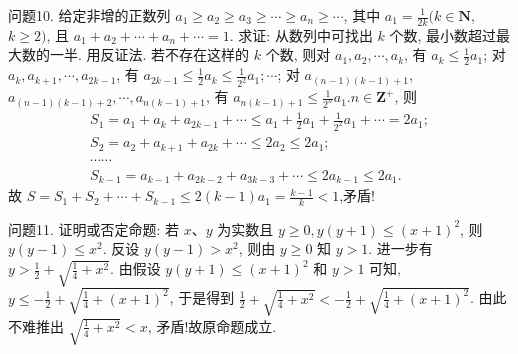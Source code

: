 问题10. 给定非增的正数列 $a_1 \geqslant a_2 \geqslant a_3 \geqslant \cdots \geqslant a_n \geqslant \cdots$, 其中 $a_1=\frac{1}{2 k}(k \in \mathbf{N}$, $k \geqslant 2)$, 且 $a_1+a_2+\cdots+a_n+\cdots=1$. 求证: 从数列中可找出 $k$ 个数, 最小数超过最大数的一半.
用反证法.
若不存在这样的 $k$ 个数, 则对 $a_1, a_2, \cdots, a_k$, 有 $a_k \leqslant \frac{1}{2} a_1$; 对 $a_k, a_{k+1}, \cdots, a_{2 k-1}$, 有 $a_{2 k-1} \leqslant \frac{1}{2} a_k \leqslant \frac{1}{2^2} a_1 ; \cdots$; 对 $a_{(n-1)(k-1)+1}$, $a_{(n-1)(k-1)+2}, \cdots, a_{n(k-1)+1}$, 有 $a_{n(k-1)+1} \leqslant \frac{1}{2^n} a_1 . n \in \mathbf{Z}^{+}$, 则
$$
\begin{gathered}
S_1=a_1+a_k+a_{2 k-1}+\cdots \leqslant a_1+\frac{1}{2} a_1+\frac{1}{2^2} a_1+\cdots=2 a_1 ; \\
S_2=a_2+a_{k+1}+a_{2 k}+\cdots \leqslant 2 a_2 \leqslant 2 a_1 ; \\
\cdots \cdots \\
S_{k-1}=a_{k-1}+a_{2 k-2}+a_{3 k-3}+\cdots \leqslant 2 a_{k-1} \leqslant 2 a_1 .
\end{gathered}
$$
故 $S=S_1+S_2+\cdots+S_{k-1} \leqslant 2(k-1) a_1=\frac{k-1}{k}<1$,矛盾!



问题11. 证明或否定命题: 若 $x 、 y$ 为实数且 $y \geqslant 0, y(y+1) \leqslant(x+1)^2$, 则 $y(y-1) \leqslant x^2$.
反设 $y(y-1)>x^2$, 则由 $y \geqslant 0$ 知 $y>1$. 进一步有 $y>\frac{1}{2}+ \sqrt{\frac{1}{4}+x^2}$. 由假设 $y(y+1) \leqslant(x+1)^2$ 和 $y>1$ 可知, $y \leqslant-\frac{1}{2}+ \sqrt{\frac{1}{4}+(x+1)^2}$, 于是得到 $\frac{1}{2}+\sqrt{\frac{1}{4}+x^2}<-\frac{1}{2}+\sqrt{\frac{1}{4}+(x+1)^2}$.
由此不难推出 $\sqrt{\frac{1}{4}+x^2}<x$, 矛盾!故原命题成立.



